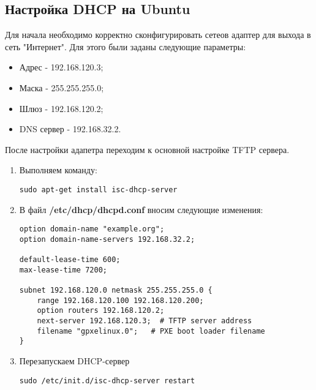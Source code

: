 \documentclass[a4paper, 12pt]{article}		%
\begin{document}
\subsection{Настройка DHCP на Ubuntu}
Для начала необходимо корректно сконфигурировать сетеов адаптер для выхода в сеть "Интернет". Для этого были заданы следующие параметры:
\begin{itemize}
\item Адрес - 192.168.120.3;
\item Маска - 255.255.255.0;
\item Шлюз - 192.168.120.2;
\item DNS сервер - 192.168.32.2.
\end{itemize}
После настройки адапетра переходим к основной настройке TFTP сервера.
\begin{enumerate}
\item Выполняем команду:
\begin{lstlisting}[language={}]
sudo apt-get install isc-dhcp-server
\end{lstlisting}
\item В файл \textbf{/etc/dhcp/dhcpd.conf} вносим следующие изменения:
\begin{lstlisting}[language={}]
option domain-name "example.org";
option domain-name-servers 192.168.32.2;

default-lease-time 600;
max-lease-time 7200;

subnet 192.168.120.0 netmask 255.255.255.0 {
    range 192.168.120.100 192.168.120.200;
    option routers 192.168.120.2;
    next-server 192.168.120.3;  # TFTP server address
    filename "gpxelinux.0";   # PXE boot loader filename
}
\end{lstlisting}
\item Перезапускаем DHCP-сервер
\begin{lstlisting}[language={}]
sudo /etc/init.d/isc-dhcp-server restart
\end{lstlisting}
\end{enumerate}
\end{document}
